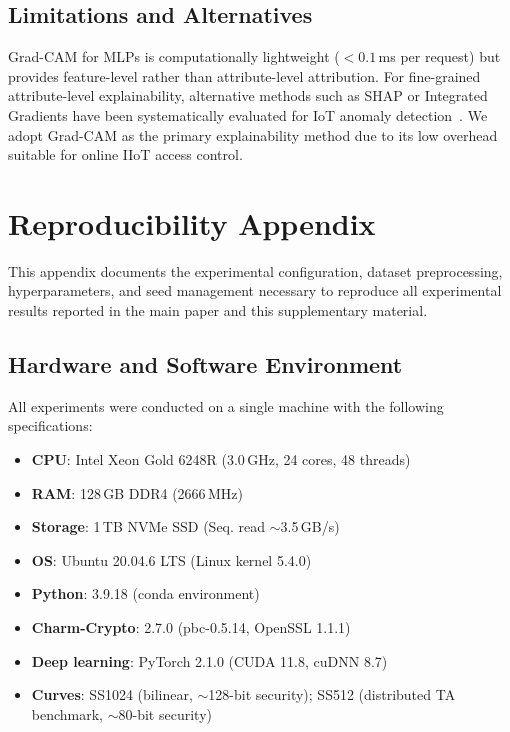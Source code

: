\documentclass[lettersize,journal]{IEEEtran}
\begin{document}
\subsection{Limitations and Alternatives}

Grad-CAM for MLPs is computationally lightweight ($<0.1$\,ms per request) but provides feature-level rather than attribute-level attribution. For fine-grained attribute-level explainability, alternative methods such as SHAP or Integrated Gradients have been systematically evaluated for IoT anomaly detection~\cite{Gummadi2025_XAI_IoT}. We adopt Grad-CAM as the primary explainability method due to its low overhead suitable for online IIoT access control.

\section{Reproducibility Appendix}
\label{sec:reproducibility}

This appendix documents the experimental configuration, dataset
preprocessing, hyperparameters, and seed management necessary to
reproduce all experimental results reported in the main paper and
this supplementary material.

\subsection{Hardware and Software Environment}

All experiments were conducted on a single machine with the following
specifications:

\begin{itemize}
    \item \textbf{CPU}: Intel Xeon Gold 6248R (3.0\,GHz, 24 cores, 48 threads)
    \item \textbf{RAM}: 128\,GB DDR4 (2666\,MHz)
    \item \textbf{Storage}: 1\,TB NVMe SSD (Seq. read $\sim$3.5\,GB/s)
    \item \textbf{OS}: Ubuntu 20.04.6 LTS (Linux kernel 5.4.0)
    \item \textbf{Python}: 3.9.18 (conda environment)
    \item \textbf{Charm-Crypto}: 2.7.0 (pbc-0.5.14, OpenSSL 1.1.1)
    \item \textbf{Deep learning}: PyTorch 2.1.0 (CUDA 11.8, cuDNN 8.7)
    \item \textbf{Curves}: SS1024 (bilinear, $\sim$128-bit security);
    SS512 (distributed TA benchmark, $\sim$80-bit security)
\end{itemize}
\end{document}
